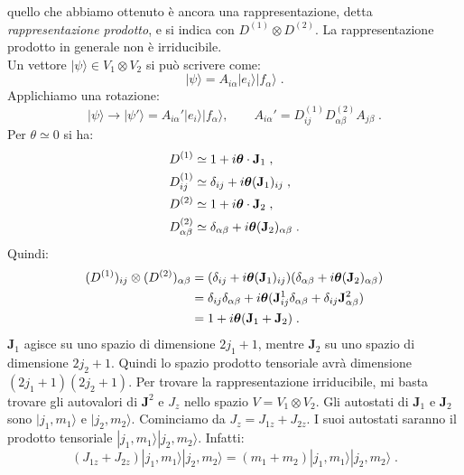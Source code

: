 \documentclass[10pt,a4paper]{report}
\theoremstyle{definition}
\numberwithin{equation}{section}
\newcommand{\ket}{\rangle}
\begin{document}
quello che abbiamo ottenuto è ancora una rappresentazione, detta \textit{rappresentazione prodotto}, e si indica con $D^{(1)}\otimes D^{(2)}$. La rappresentazione prodotto in generale non è irriducibile.\\
Un vettore $|\psi\ket\in V_1\otimes V_2$ si può scrivere come:
\begin{equation}
|\psi\ket=A_{i\alpha}|e_i\ket|f_{\alpha}\ket\;.
\end{equation}
Applichiamo una rotazione:
\begin{equation}
|\psi\ket \longrightarrow |\psi'\ket= A_{i\alpha}'|e_i\ket|f_{\alpha}\ket, \qquad A_{i\alpha}'=D_{ij}^{(1)}D_{\alpha\beta}^{(2)}A_{j\beta}\;.
\end{equation}
Per $\theta \simeq 0$ si ha:
\begin{align}
D^{(1)} &\simeq 1+i\boldsymbol{\theta}\cdot \mathbf{J}_1\;, \notag \\
D_{ij}^{(1)} &\simeq \delta_{ij}+i\boldsymbol{\theta}(\mathbf{J}_1)_{ij} \notag\;, \\
D^{(2)} &\simeq 1+i\boldsymbol{\theta}\cdot\mathbf{J}_2 \notag\;, \\
D_{\alpha\beta}^{(2)} &\simeq \delta_{\alpha\beta}+i\boldsymbol{\theta}(\mathbf{J}_2)_{\alpha\beta}\;.
\end{align}
Quindi:
\begin{align}
(D^{(1)})_{ij}\otimes (D^{(2)})_{\alpha\beta} &= (\delta_{ij}+i\boldsymbol{\theta}(\mathbf{J}_1)_{ij})(\delta_{\alpha\beta}+i\boldsymbol{\theta}(\mathbf{J}_2)_{\alpha\beta}) \notag \\
&= \delta_{ij}\delta_{\alpha\beta}+i\boldsymbol{\theta}(\mathbf{J}^1_{ij}\delta_{\alpha\beta}+\delta_{ij}\mathbf{J}^2_{\alpha\beta})  \notag \\
&= 1+i\boldsymbol{\theta}(\mathbf{J}_1+\mathbf{J}_2)\;.
\end{align}
$\mathbf{J}_1$ agisce su uno spazio di dimensione $2j_1+1$, mentre $\mathbf{J}_2$ su uno spazio di dimensione $2j_2+1$. Quindi lo spazio prodotto tensoriale avrà dimensione $(2j_1+1)(2j_2+1)$. Per trovare la rappresentazione irriducibile, mi basta trovare gli autovalori di $\mathbf{J}^2$ e $J_z$ nello spazio $V=V_1\otimes V_2$. Gli autostati di $\mathbf{J}_1$ e $\mathbf{J}_2$ sono $|j_1,m_1\ket$ e $|j_2,m_2\ket$. Cominciamo da $J_z=J_{1z}+J_{2z}$. I suoi autostati saranno il prodotto tensoriale $|j_1,m_1\ket|j_2,m_2\ket$. Infatti:
\begin{equation}
(J_{1z}+J_{2z})|j_1,m_1\ket|j_2,m_2\ket=(m_1+m_2)|j_1,m_1\ket|j_2,m_2\ket\;.
\end{equation}
\end{document}
